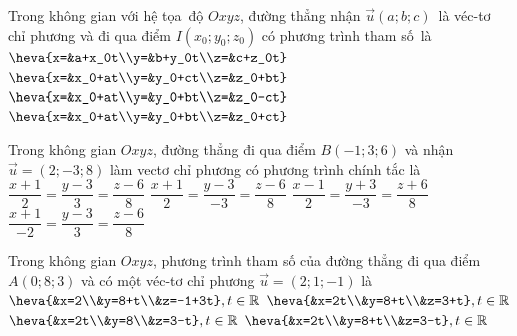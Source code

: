 \begin{ex}%
	Trong không gian với hệ tọa~độ  $Oxyz$, đường thẳng nhận ${\overrightarrow{u}}\left(a;b;c\right)$~là véc-tơ chỉ phương và đi qua điểm ${I}\left({x}_0;{{y}_0};{{z}_0}\right)$ có phương trình tham số~là
	 \choice
		{$\heva{x=&a+x_0t\\y=&b+y_0t\\z=&c+z_0t}$} 
		{$\heva{x=&x_0+at\\y=&y_0+ct\\z=&z_0+bt}$} 
		{$\heva{x=&x_0+at\\y=&y_0+bt\\z=&z_0-ct}$} 
		{\True  $\heva{x=&x_0+at\\y=&y_0+bt\\z=&z_0+ct}$}
\end{ex}

\begin{ex}%
	Trong không gian $Oxyz$, đường thẳng đi qua điểm $B(-1; 3; 6)$ và nhận $\overrightarrow{u}=(2;-3; 8)$ làm vectơ chỉ phương có  phương trình chính tắc là
	 \choice
		{$\dfrac{x+1}{2}=\dfrac{y-3}{3}=\dfrac{z-6}{8}$} 
		{\True $\dfrac{x+1}{2}=\dfrac{y-3}{-3}=\dfrac{z-6}{8}$} 
		 {$\dfrac{x-1}{2}=\dfrac{y+3}{-3}=\dfrac{z+6}{8}$}
		{$\dfrac{x+1}{-2}=\dfrac{y-3}{3}=\dfrac{z-6}{8}$} 
\end{ex}

\begin{ex}%
	Trong không gian $Oxyz$, phương  trình tham số của đường thẳng đi qua điểm $A(0;8;3)$ và có một véc-tơ chỉ phương $\overrightarrow{u}=(2;1;-1)$ là
	\choice 
		{$\heva{&x=2\\&y=8+t\\&z=-1+3t},t\in\mathbb{R}$} 
		{$\heva{&x=2t\\&y=8+t\\&z=3+t},t\in\mathbb{R}$} 
		{$\heva{&x=2t\\&y=8\\&z=3-t},t\in\mathbb{R}$} 
		{\True  $\heva{&x=2t\\&y=8+t\\&z=3-t},t\in\mathbb{R}$}
\end{ex}

